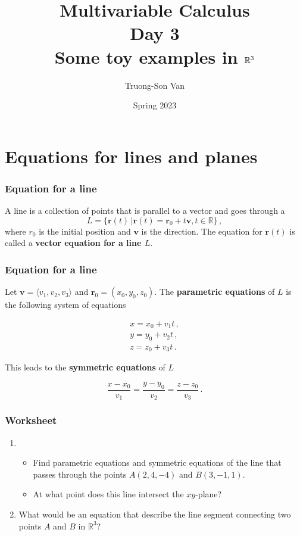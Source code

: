 \documentclass[aspectratio=169]{beamer}
\title{ Multivariable Calculus \\ Day 3 \\ Some toy examples in $\R^3$}
\institute{Fulbright University Vietnam}
\author{Truong-Son Van}
\date{Spring 2023}
\newcommand{\vect}{\mathbf}
\newcommand{\R}{\mathbb{R}}
\begin{document}
\maketitle

\section{Equations for lines and planes}

\begin{frame}
    \frametitle{Equation for a line}
A line is a collection of points that is parallel to a vector and goes through a 
\begin{equation*}
    L = \{\vect{r}(t) \,|  \vect{r}(t) = \vect{r}_0 + t \vect{v}, t\in \R \}  \,,
\end{equation*}
where ${r}_0$ is the initial position and $\vect{v}$ is the direction.
The equation for $\vect{r}(t)$ is called a \textbf{vector equation for a line $L$}.
\end{frame}

\begin{frame}
    \frametitle{Equation for a line}
Let $\vect{v} = \langle v_1, v_2, v_3 \rangle$ and $\vect{r}_0 = ( x_0, y_0, z_0 )$.
The \textbf{parametric equations} of $L$ is the following system of equations

\begin{gather*}
    x = x_0 + v_1 t\,, \\
    y = y_0 + v_2 t\,, \\
    z = z_0 + v_3 t \,. 
\end{gather*}

This leads to the \textbf{symmetric equations} of $L$

\begin{equation*}
    \frac{x - x_0}{v_1} = \frac{y - y_0}{v_2} = \frac{z - z_0}{v_3} \,.
\end{equation*}
\end{frame}

\begin{frame}
    \frametitle{Worksheet}
    \begin{enumerate}
        \item \begin{itemize}
                \item Find parametric equations and symmetric equations of the line that passes 
    through the points $A(2,4,-4)$ and $B(3,-1,1)$.
        \item At what point does this line intersect the $xy$-plane?
            \end{itemize}
        \item What would be an equation that describe the line segment 
            connecting two points $A$ and $B$ in $\R^3$?
    \end{enumerate}
\end{frame}
\end{document}
